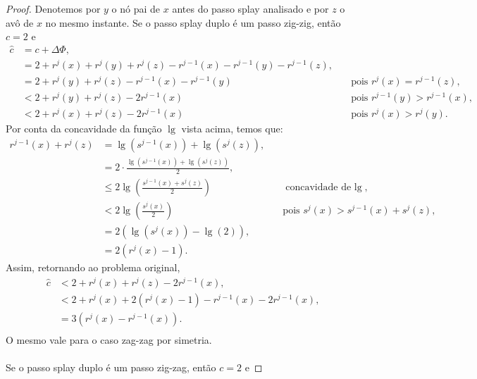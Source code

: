 \begin{proof}
    Denotemos por $y$ o nó pai de $x$ antes do passo splay analisado e por $z$ o avô de $x$ no mesmo instante. Se o passo splay duplo é um passo zig-zig, então $c = 2$ e
    \begin{align*}
        \hat{c} &= c + \Delta \Phi,\\
        &= 2 + r^{j}(x) + r^{j}(y) + r^{j}(z) - r^{j-1}(x) - r^{j-1}(y) - r^{j-1}(z), \quad & \text{}\\
        &= 2 + r^{j}(y) + r^{j}(z) - r^{j-1}(x) - r^{j-1}(y) \quad & \text{pois $r^{j}(x) = r^{j-1}(z)$},\\
        &< 2 + r^{j}(y) + r^{j}(z) - 2r^{j-1}(x) \quad & \text{pois $r^{j-1}(y) > r^{j-1}(x)$}, \\
        &< 2 + r^{j}(x) + r^{j}(z) - 2r^{j-1}(x) \quad & \text{pois $r^{j}(x) > r^{j}(y)$}.
    \end{align*}
    Por conta da concavidade da função $\lg$ vista acima, temos que:
    \begin{align*}
        r^{j-1}(x) + r^{j}(z) &= \lg(s^{j-1}(x)) + \lg(s^{j}(z)), \quad & \text{}\\
        &= 2 \cdot \frac{\lg(s^{j-1}(x)) + \lg(s^{j}(z))}{2}, \quad & \text{} \\
        &\leq 2 \lg(\frac{s^{j-1}(x) + s^{j}(z)}{2}) \quad & \text{concavidade de $\lg$}, \\
        &< 2 \lg(\frac{s^{j}(x)}{2}) \quad & \text{pois $s^{j}(x) > s^{j-1}(x) + s^{j}(z)$}, \\
        &= 2 (\lg(s^{j}(x)) - \lg(2)),\\
        &= 2 (r^{j}(x) - 1).
    \end{align*}
    Assim, retornando ao problema original,
    \begin{align*}
        \hat{c} &< 2 + r^{j}(x) + r^{j}(z) - 2r^{j-1}(x), \\
        &< 2 + r^{j}(x) +  2 (r^{j}(x) - 1) - r^{j-1}(x) - 2r^{j-1}(x), \\
        &= 3(r^{j}(x) - r^{j-1}(x)). \\
    \end{align*}
    O mesmo vale para o caso zag-zag por simetria. \\ \\ Se o passo splay duplo é um passo zig-zag, então $c = 2$ e

\end{proof}

